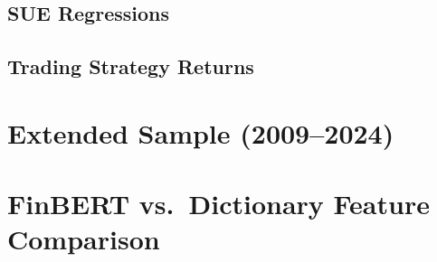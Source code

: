 \documentclass[12pt,a4paper,oneside]{report}
\begin{document}
\subsection{SUE Regressions}
\label{sec:sue_regressions}

\subsection{Trading Strategy Returns}
\label{sec:trading_results}

\section{Extended Sample (2009--2024)}
\label{sec:extension_results}

\section{FinBERT vs.\ Dictionary Feature Comparison}
\label{sec:finbert_results}
\end{document}
